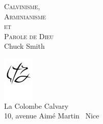 

\begin{titlepage}
\begin{center}
\mbox{}
\vfill
\textsc{ \Huge Calvinisme,\\[0.4cm] Arminianisme\\[0.4cm] et\\[0.4cm] Parole de Dieu}\\[1.5cm]

{\LARGE Chuck Smith}\\[1cm]
\vfill

\includegraphics[width=4em]{revival_potrace} \\[-5mm]
\logofont\large La Colombe Calvary \\
\normalfont\normalsize 10, avenue Aimé Martin ~Nice\\

\end{center}
\end{titlepage}

